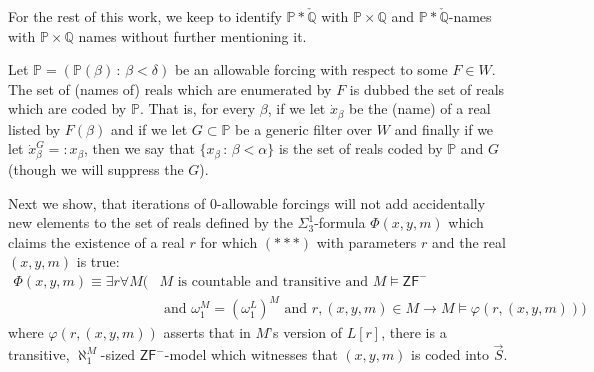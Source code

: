 \documentclass[a4paper,11pt]{article}
\newcommand{\forceP}{\mathbb{P}}
\newcommand{\forceQ}{\mathbb{Q}}
\newcommand{\ZFP}{\mathsf{ZF}^-}
\begin{document}
For the rest of this work, we keep to identify $\forceP \ast \check{\forceQ}$  with
$\forceP \times \forceQ$ and  $\forceP \ast \check{\forceQ}$-names with $\forceP \times \forceQ$ names without further mentioning it. 

Let $\forceP= (\forceP(\beta) \, : \, \beta < \delta)$ be an allowable forcing with respect to some $F \in W$.
The set of  (names of) reals which are enumerated by $F$ is dubbed the set of reals which are coded by $\forceP$. That is, for every $\beta$, if we let $\dot{x}_{\beta}$ be the (name) of a real  listed by $F(\beta)$ and if we let $G \subset \forceP$ be a generic filter over $W$ and finally if we let
$ \dot{x}_{\beta}^G =:x_{\beta}$,  then we say that
$\{ x_{\beta} \, : \, \beta < \alpha \}$ is the set of reals coded by $\forceP$ and $G$ (though we will suppress the $G$).

Next we show, that iterations of 0-allowable forcings will not add accidentally new elements to the set of reals defined by the $\Sigma^1_3$-formula $\Phi(x,y,m)$ which claims the existence of a real $r$ for which $({\ast} {\ast} {\ast})$ with parameters $r$ and the real $(x,y,m)$ is true:
\begin{align*}
 \Phi(x,y,m) \equiv \exists r  \forall M (&M \text{ is countable and transitive and } M \models \ZFP \\&\text{ and } \omega_1^M=(\omega_1^L)^M \text{ and }  r, (x,y,m) \in M  \rightarrow M \models \varphi (r,(x,y,m)) )
\end{align*}
where $\varphi(r,(x,y,m))$ asserts that in $M$'s version of $L[r]$, there is a transitive, $\aleph_1^M$-sized $\ZFP$-model which witnesses that $(x,y,m)$ is coded into $\vec{S}$.
\end{document}
